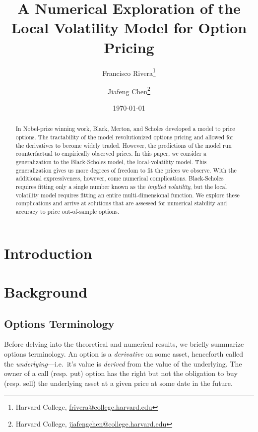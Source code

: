 \documentclass[12pt]{article}
\numberwithin{equation}{section}
\begin{document}
\onecolumn

\title{A Numerical Exploration of the Local Volatility Model for Option Pricing}
\author{Francisco Rivera\thanks{Harvard College, 
\href{mailto:frivera@college.harvard.edu}{frivera@college.harvard.edu} 
} \and Jiafeng Chen\thanks{Harvard College, \href{mailto:jiafengchen@college.harvard.edu}{jiafengchen@college.harvard.edu}}}
\date{\today}

\maketitle

\begin{abstract}
In Nobel-prize winning work, Black, Merton, and Scholes developed a model to
price options. The tractability of the model revolutionized options pricing and
allowed for the derivatives to become widely traded. However, the predictions of
the model run counterfactual to empirically observed prices. In this paper, we
consider a generalization to the Black-Scholes model, the local-volatility
model. This generalization gives us more degrees of freedom to fit the prices we
observe. With the additional expressiveness, however, come numerical
complications. Black-Scholes requires fitting only a single number known as the
\emph{implied volatility}, but the local volatility model requires fitting an
entire multi-dimensional function. We explore these complications and arrive at
solutions that are assessed for numerical stability and accuracy to price
out-of-sample options.
\end{abstract}

\tableofcontents

\newpage

\section{Introduction}

\section{Background}
\label{sec:background}

\subsection{Options Terminology}
\label{subsec:terminology}

Before delving into the theoretical and numerical results, we briefly summarize
options terminology. An option is a \emph{derivative} on some asset, henceforth
called the \emph{underlying}---i.e.\ it's value is \emph{derived} from the value
of the underlying. The owner of a call (resp. put) option has the right but not
the obligation to buy (resp. sell) the underlying asset at a given price at some
date in the future.
\end{document}
